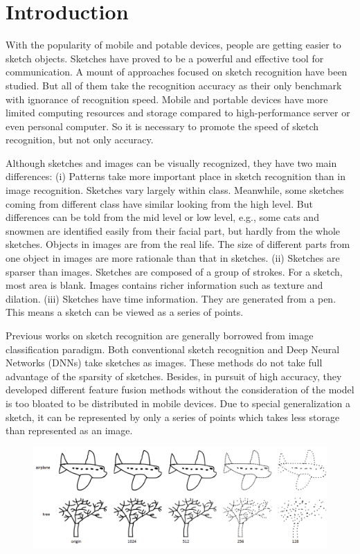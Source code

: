 \section{Introduction}
\label{sec:intro}

With the popularity of mobile and potable devices, people are getting easier to sketch objects. Sketches have proved to be a powerful and effective tool for communication. A mount of approaches focused on sketch recognition have been studied. But all of them take the recognition accuracy as their only benchmark with ignorance of recognition speed. Mobile and portable devices have more limited computing resources and storage compared to high-performance server or even personal computer. So it is necessary to promote the speed of sketch recognition, but not only accuracy.

Although sketches and images can be visually recognized, they have two main differences: (i) Patterns take more important place in sketch recognition than in image recognition. Sketches vary largely within class. Meanwhile, some sketches coming from different class have similar looking from the high level. But differences can be told from the mid level or low level, e.g., some cats and snowmen are identified easily from their facial part, but hardly from the whole sketches. Objects in images are from the real life. The size of different parts from one object in images are more rationale than that in sketches. (ii) Sketches are sparser than images. Sketches are composed of a group of strokes. For a sketch, most area is blank. Images contains richer information such as texture and dilation. (iii) Sketches have time information. They are generated from a pen. This means a sketch can be viewed as a series of points.

Previous works on sketch recognition are generally borrowed from image classification paradigm. Both conventional sketch recognition and Deep Neural Networks (DNNs) take sketches as images. These methods do not take full advantage of the sparsity of sketches. Besides, in pursuit of high accuracy, they developed different feature fusion methods without the consideration of the model is too bloated to be distributed in mobile devices. Due to special generalization a sketch, it can be represented by only a series of points which takes less storage than represented as an image.

\begin{figure}
    \center
    \includegraphics[width=6.5in]{images/resample.png}
    \label{fig:resample}
\end{figure}

